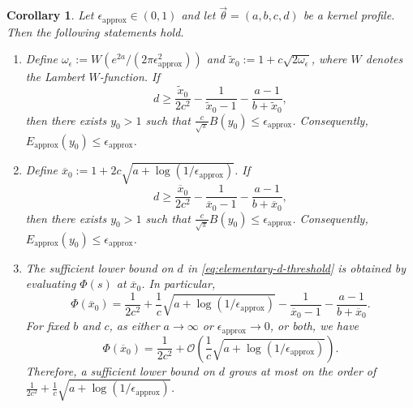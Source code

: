\documentclass[10pt,reqno]{article}
\numberwithin{equation}{section}
\theoremstyle{plain}
\newtheorem{cor}[thm]{Corollary}
\theoremstyle{definition}
\begin{document}
\begin{cor}\label{feasible-kernel-profile-explicit}
Let \(\epsilon_{\operatorname{approx}} \in (0,1)\) and let \(\vec{\theta}=(a,b,c,d)\) be a kernel profile. Then the following statements hold.

\begin{enumerate}
\item   Define \(\omega_\epsilon := W(e^{2a}/(2\pi\epsilon_{\operatorname{approx}}^2))\) and \(\widetilde x_0 := 1+c\sqrt{2\omega_\epsilon}\), where \(W\) denotes the Lambert \(W\)-function. If
\begin{equation}\label{eq:lambertW-d-threshold}
d \ge \frac{\widetilde x_0}{2c^2}-\frac{1}{\widetilde x_0-1}-\frac{a-1}{b+\widetilde x_0},
\end{equation}
then there exists \(y_0>1\) such that \(\frac{c}{\sqrt{\pi}}B(y_0)\le \epsilon_{\operatorname{approx}}\). Consequently, \(E_{\operatorname{approx}}(y_0)\le \epsilon_{\operatorname{approx}}\).

\item   Define \(\overline x_0 := 1+2c\sqrt{a+\log(1/\epsilon_{\operatorname{approx}})}\). If
\begin{equation}\label{eq:elementary-d-threshold}
d \ge \frac{\overline x_0}{2c^2}-\frac{1}{\overline x_0-1}-\frac{a-1}{b+\overline x_0},
\end{equation}
then there exists \(y_0>1\) such that \(\frac{c}{\sqrt{\pi}}B(y_0)\le \epsilon_{\operatorname{approx}}\). Consequently, \(E_{\operatorname{approx}}(y_0)\le \epsilon_{\operatorname{approx}}\).

\item The sufficient lower bound on \(d\) in \cref{eq:elementary-d-threshold} is obtained by evaluating \(\Phi(s)\) at \(\overline x_0\). In particular,
\begin{equation}
\Phi(\overline x_0) = \frac{1}{2c^2}+\frac{1}{c}\sqrt{a+\log(1/\epsilon_{\operatorname{approx}})}-\frac{1}{\overline x_0-1}-\frac{a-1}{b+\overline x_0}.
\end{equation}
For fixed \(b\) and \(c\), as either \(a\to\infty\) or \(\epsilon_{\operatorname{approx}}\to 0\), or both, we have
\begin{equation}
\Phi(\overline x_0) = \frac{1}{2c^2}+\mathcal O\left(\frac{1}{c}\sqrt{a+\log(1/\epsilon_{\operatorname{approx}})}\right).
\end{equation}
Therefore, a sufficient lower bound on \(d\) grows at most on the order of \(\frac{1}{2c^2}+\frac{1}{c}\sqrt{a+\log(1/\epsilon_{\operatorname{approx}})}\).
\end{enumerate}
\end{cor}
\end{document}

